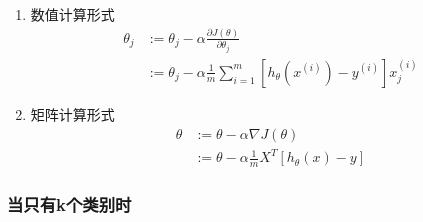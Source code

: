 \begin{enumerate}
\item 数值计算形式
\begin{equation}\begin{aligned}
	\theta_j &:= \theta_j - \alpha\frac{\partial J(\theta)}{\partial \theta_j} \\
	    &:= \theta_j - \alpha \frac{1}{m} \sum_{i=1}^m \left[h_\theta(x^{(i)}) - y^{(i)}\right] x_j^{(i)}
\end{aligned}\end{equation}

\item 矩阵计算形式
\begin{equation}\begin{aligned}
	\theta &:= \theta - \alpha\nabla J(\theta) \\
		&:= \theta - \alpha \frac{1}{m} X^T \left[h_\theta(x) - y\right]
\end{aligned}\end{equation}
\end{enumerate}



\subsubsection{当只有k个类别时}
